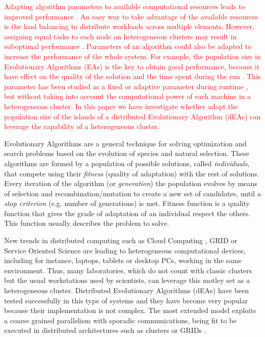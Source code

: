 \documentclass[final,1p,times]{elsarticle}
\begin{document}
\textcolor{red}{Adapting algorithm parameters to available computational resources leads to improved performance \cite{AutomaticallyConfiguringStyles12}. An easy way to take advantage of the available resources is the load balancing \cite{PARALLELIMPLEMENTATION} to distribute workloads across multiple elements. However, assigning equal tasks  to each node on heterogeneous clusters may result in suboptimal performance \cite{LoadBalancingBohn02}. Parameters of an algorithm could also be adapted to increase the performance of the whole system. For example, the population size in Evolutionary Algorithms (EAs) is the key to obtain good performance, because it have effect on the quality of the solution and the time spent during the run \cite{ShrinkageLaredo09}. This parameter has been studied as a fixed \cite{SizingHarik99} or adaptive parameter during runtime \cite{AdaptiveLobo07}, but without taking into account the computational power of each machine in a heterogeneous cluster. In this paper we have investigate whether adapt the population size of the islands of a distributed Evolutionary Algorithm (dEAs) \cite{MULTIKULTI} can leverage the capability of a heterogeneous cluster.}

Evolutionary Algorithms are a general technique for solving optimization and search problems based on the evolution of species and natural selection. These algorithms are formed by a population of possible solutions, called {\em individuals}, that compete using their {\em fitness} (quality of adaptation) with the rest of solutions. Every iteration of the algorithm (or {\em generation}) the population evolves by means of selection and recombination/mutation to create a new set of candidates, until a {\em stop criterion} (e.g. number of generations) is met. Fitness function is a quality function that gives the grade of adaptation of an individual respect the others. This function usually describes the problem to solve.

New trends in distributed computing such as Cloud Computing \cite{CLOUD}, GRID
\cite{OPENSCIENCEGRID} or Service Oriented Science \cite{GLOBUS} are
leading to heterogeneous computational devices, including for instance, laptops,
tablets or desktop PCs, working in the same
environment. Thus, many laboratories, which do not count with classic
clusters but the usual workstations used by scientists, can leverage
this motley set as a heterogeneous cluster. Distributed Evolutionary
Algorithms (dEAs) \cite{MULTIKULTI,PARALLELGRIDHETEROGENEOUS} have been tested successfully in this
type of systems \cite{HETEROGENEOUSHARD} and they have become very popular because their implementation is
not complex.  %
The most extended model exploits a coarse grained parallelism with sporadic %
 communications, being fit to be executed in distributed architectures
 such as clusters or GRIDs \cite{PLATO}.%
\end{document}
